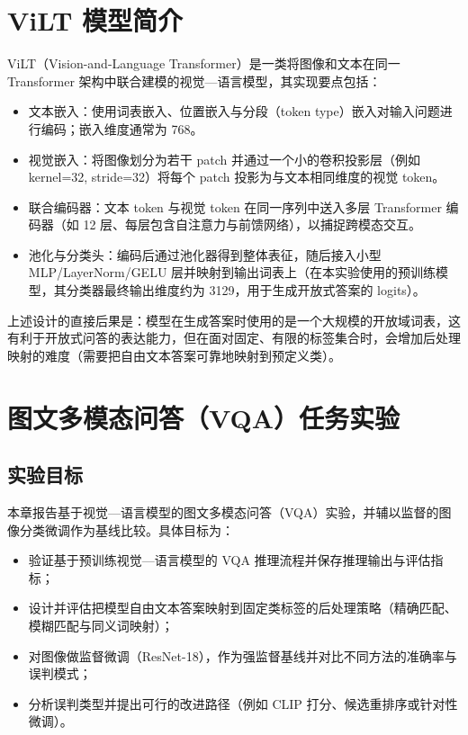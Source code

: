 \chapter{ViLT 模型简介}

ViLT（Vision-and-Language Transformer）是一类将图像和文本在同一 Transformer 架构中联合建模的视觉—语言模型，其实现要点包括：
\begin{itemize}
  \item 文本嵌入：使用词表嵌入、位置嵌入与分段（token type）嵌入对输入问题进行编码；嵌入维度通常为 768。
  \item 视觉嵌入：将图像划分为若干 patch 并通过一个小的卷积投影层（例如 kernel=32, stride=32）将每个 patch 投影为与文本相同维度的视觉 token。
  \item 联合编码器：文本 token 与视觉 token 在同一序列中送入多层 Transformer 编码器（如 12 层、每层包含自注意力与前馈网络），以捕捉跨模态交互。
  \item 池化与分类头：编码后通过池化器得到整体表征，随后接入小型 MLP/LayerNorm/GELU 层并映射到输出词表上（在本实验使用的预训练模型，其分类器最终输出维度约为 3129，用于生成开放式答案的 logits）。
\end{itemize}

上述设计的直接后果是：模型在生成答案时使用的是一个大规模的开放域词表，这有利于开放式问答的表达能力，但在面对固定、有限的标签集合时，会增加后处理映射的难度（需要把自由文本答案可靠地映射到预定义类）。


\chapter{图文多模态问答（VQA）任务实验}

\section{实验目标}
本章报告基于视觉—语言模型的图文多模态问答（VQA）实验，并辅以监督的图像分类微调作为基线比较。具体目标为：
\begin{itemize}
  \item 验证基于预训练视觉—语言模型的 VQA 推理流程并保存推理输出与评估指标；
  \item 设计并评估把模型自由文本答案映射到固定类标签的后处理策略（精确匹配、模糊匹配与同义词映射）；
  \item 对图像做监督微调（ResNet-18），作为强监督基线并对比不同方法的准确率与误判模式；
  \item 分析误判类型并提出可行的改进路径（例如 CLIP 打分、候选重排序或针对性微调）。
\end{itemize}

